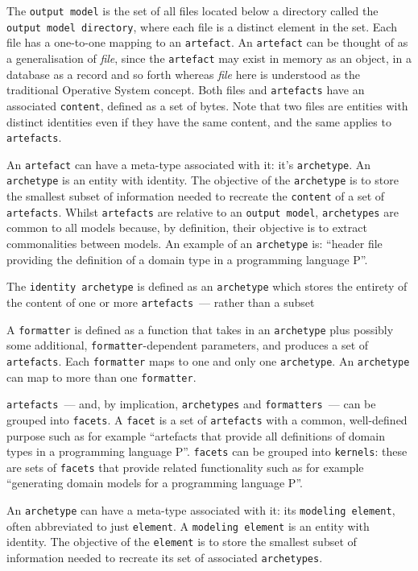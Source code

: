 \documentclass{book}
\begin{document}
The \texttt{output model} is the set of all files located below a
directory called the \texttt{output model directory}, where each file
is a distinct element in the set. Each file has a one-to-one mapping
to an \texttt{artefact}. An \texttt{artefact} can be thought of as a
generalisation of \emph{file}, since the \texttt{artefact} may exist
in memory as an object, in a database as a record and so forth whereas
\emph{file} here is understood as the traditional Operative System
concept. Both files and \texttt{artefacts} have an associated
\texttt{content}, defined as a set of bytes. Note that two files are
entities with distinct identities even if they have the same content,
and the same applies to \texttt{artefacts}.

An \texttt{artefact} can have a meta-type associated with it: it's
\texttt{archetype}.  An \texttt{archetype} is an entity with
identity. The objective of the \texttt{archetype} is to store the
smallest subset of information needed to recreate the \texttt{content}
of a set of \texttt{artefacts}. Whilst \texttt{artefacts} are relative
to an \texttt{output model}, \texttt{archetypes} are common to all
models because, by definition, their objective is to extract
commonalities between models. An example of an \texttt{archetype} is:
``header file providing the definition of a domain type in a
programming language P''.

The \texttt{identity archetype} is defined as an \texttt{archetype}
which stores the entirety of the content of one or more
\texttt{artefacts}~--- rather than a subset

A \texttt{formatter} is defined as a function that takes in an
\texttt{archetype} plus possibly some additional,
\texttt{formatter}-dependent parameters, and produces a set of
\texttt{artefacts}. Each \texttt{formatter} maps to one and only one
\texttt{archetype}. An \texttt{archetype} can map to more than one
\texttt{formatter}.

\texttt{artefacts}~--- and, by implication, \texttt{archetypes} and
\texttt{formatters}~--- can be grouped into \texttt{facets}. A
\texttt{facet} is a set of \texttt{artefacts} with a common,
well-defined purpose such as for example ``artefacts that provide all
definitions of domain types in a programming language
P''. \texttt{facets} can be grouped into \texttt{kernels}: these are
sets of \texttt{facets} that provide related functionality such as for
example ``generating domain models for a programming language P''.

An \texttt{archetype} can have a meta-type associated with it: its
\texttt{modeling element}, often abbreviated to just
\texttt{element}. A \texttt{modeling element} is an entity with
identity. The objective of the \texttt{element} is to store the
smallest subset of information needed to recreate its set of
associated \texttt{archetypes}.
\end{document}
